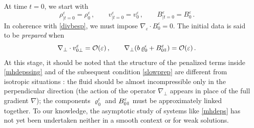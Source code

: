 \documentclass[11pt,reqno]{amsart}
\newcommand{\myparallel}{{\mkern3mu\vphantom{\perp}\vrule depth 0pt\mkern2mu\vrule depth 0pt\mkern3mu}}
\begin{document}
At time $ t=0 $, we start with
\begin{equation}
  \label{initial-data-eps}
  \rho^\varepsilon_{\mid t=0 } =\rho_0^\varepsilon\,, \qquad  v^\varepsilon_{\mid t=0 } =v_0^\varepsilon\,, \qquad  B^\varepsilon_{\mid t=0 }=B_0^\varepsilon \, .
\end{equation}
In coherence with \eqref{divbesp}, we must impose $ \nabla_\varepsilon \cdot B_0 ^\varepsilon = 0 $. The initial data is said to be {\it prepared} when
 \begin{equation}
\nabla_\perp  \cdot v^\varepsilon_{0\perp} = \mathcal{O}(\varepsilon) \,, \qquad \nabla_\perp ( b \, \varrho^\epsilon_0 + B^\varepsilon_{0 \myparallel }) = \mathcal{O}(\varepsilon) \, .
\label{slowprep0}
\end{equation}
 At this stage, it should be noted that the structure of the penalized terms inside \eqref{mhdepssing} and of the subsequent condition \eqref{slowprep} are   different from isotropic  situations \cite{JSX19}: the fluid should be almost incompressible only in the perpendicular direction (the action of the operator $ \nabla_\perp $ appears in place of the full gradient $ \nabla $); the components $  \varrho^\epsilon_0 $ and $ B^\varepsilon_{0 \myparallel } $ must be approximately linked together. To our knowledge, the asymptotic study of systems like \eqref{mhdeps} has not yet been undertaken neither in a smooth context or for weak solutions.
\end{document}

